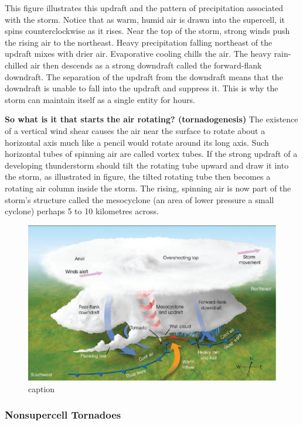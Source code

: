 \documentclass[12pt,oneside]{book}
\begin{document}
This figure illustrates this updraft and the pattern of precipitation
associated with the storm. Notice that as warm, humid air is drawn into
the supercell, it spins counterclockwise as it rises. Near the top of
the storm, strong winds push the rising air to the northeast. Heavy
precipitation falling northeast of the updraft mixes with drier air.
Evaporative cooling chills the air. The heavy rain-chilled air then
descends as a strong downdraft called the forward-flank downdraft. The
separation of the updraft from the downdraft means that the downdraft is
unable to fall into the updraft and suppress it. This is why the storm
can maintain itself as a single entity for hours.

\textbf{So what is it that starts the air rotating? (tornadogenesis)}
The existence of a vertical wind shear causes the air near the surface
to rotate about a horizontal axis much like a pencil would rotate around
its long axis. Such horizontal tubes of spinning air are called vortex
tubes. If the strong updraft of a developing thunderstorm should tilt
the rotating tube upward and draw it into the storm, as illustrated in
figure, the tilted rotating tube then becomes a rotating air column
inside the storm. The rising, spinning air is now part of the storm's
structure called the mesocyclone (an area of lower pressure a small
cyclone) perhaps 5 to 10 kilometres across.

\begin{figure}

{\centering \includegraphics[width=0.8\linewidth]{figures/FigureE10} 

}

\caption{caption}\label{fig:SupercellTornadoes3}
\end{figure}

\subsubsection{Nonsupercell Tornadoes}\label{nonsupercell-tornadoes}
\end{document}
